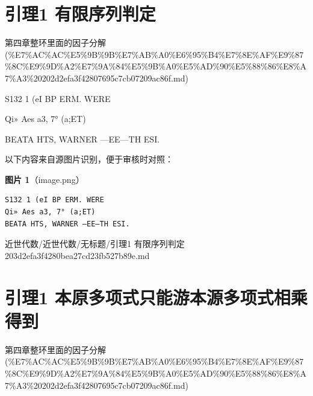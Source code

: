\section*{引理1 有限序列判定}

\begin{note}[来源上级主题]

第四章整环里面的因子分解 (\%E7\%AC\%AC\%E5\%9B\%9B\%E7\%AB\%A0\%E6\%95\%B4\%E7\%8E\%AF\%E9\%87\%8C\%E9\%9D\%A2\%E7\%9A\%84\%E5\%9B\%A0\%E5\%AD\%90\%E5\%88\%86\%E8\%A7\%A3\%20202d2efa3f42807695c7cb07209ac86f.md)

\end{note}

\begin{lemma}[引理1 有限序列判定]

S132 1 (eI BP ERM. WERE

Qi» Aes a3, 7° (a;ET)

BEATA HTS, WARNER —EE—TH ESI.

\end{lemma}

\begin{note}
以下内容来自源图片识别，便于审核时对照：

\textbf{图片 1}（image.png）
\begin{Verbatim}[fontsize=\small]
S132 1 (eI BP ERM. WERE
Qi» Aes a3, 7° (a;ET)
BEATA HTS, WARNER —EE—TH ESI.
\end{Verbatim}

\end{note}

\begin{note}[来源路径]

近世代数/近世代数/无标题/引理1 有限序列判定 203d2efa3f4280bea27cd23fb527b89e.md

\end{note}

\section*{引理1 本原多项式只能游本源多项式相乘得到}

\begin{note}[来源上级主题]

第四章整环里面的因子分解 (\%E7\%AC\%AC\%E5\%9B\%9B\%E7\%AB\%A0\%E6\%95\%B4\%E7\%8E\%AF\%E9\%87\%8C\%E9\%9D\%A2\%E7\%9A\%84\%E5\%9B\%A0\%E5\%AD\%90\%E5\%88\%86\%E8\%A7\%A3\%20202d2efa3f42807695c7cb07209ac86f.md)

\end{note}

